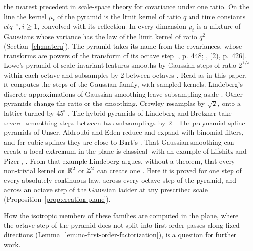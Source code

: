 the nearest precedent in scale-space theory for covariance under one ratio. On the line the kernel
$\mu_t$ of the \Matern{} pyramid is the limit kernel of ratio $q$ and time constants $ctq^{-i}$,
$i \ge 1$, convolved with its reflection. In every dimension $\mu_t$ is a mixture of Gaussians whose
variance has the law of the limit kernel of ratio $q^2$ (Section~\ref{ch:matern}). The \Matern{} pyramid takes its name from the \Matern{}
covariances, whose transforms are powers of the transform of its octave step [, p.~448; , (2), p.~426].
Lowe's pyramid of scale-invariant features smooths by Gaussian steps of ratio $2^{1/s}$ within each
octave and subsamples by $2$ between octaves \cite[pp.~6--7]{lowe2004distinctive}. Read as in this
paper, it computes the steps of the Gaussian family, with sampled kernels. Lindeberg's discrete
approximations of Gaussian smoothing leave subsampling aside \cite[p.~762]{lindeberg2024discrete}.
Other pyramids change the ratio or the smoothing. Crowley resamples by $\sqrt2$, onto a lattice
turned by $45^\circ$ \cite[\S 3.3.2, p.~32]{crowley1981representation}. The hybrid pyramids of
Lindeberg and Bretzner take several smoothing steps between two subsamplings by~$2$
\cite[\S 3.1]{lindeberg2003real}. The polynomial spline pyramids of Unser, Aldroubi and Eden reduce
and expand with binomial filters, and for cubic splines they are close to Burt's
\cite[\S IV.B, p.~370]{unser1993polynomial}.
That Gaussian smoothing can create a local extremum in the plane is classical, with an example of
Lifshitz and Pizer \cite[\S 4.1, p.~101]{lindeberg1994scale}, \cite[p.~369]{damonLocalMorseTheory1995}.
From that example Lindeberg argues, without a theorem, that every non-trivial kernel on $\mathbb{R}^2$ or
$\mathbb{Z}^2$ can create one \cite[\S 4.1, p.~101]{lindeberg1994scale}. Here it is proved for one step of every
absolutely continuous law, across every octave step of the \Matern{} pyramid, and across an octave
step of the Gaussian ladder at any prescribed scale (Proposition~\ref{prop:creation-plane}).

How the isotropic members of these families are computed in the plane, where the octave step of the
\Matern{} pyramid does not split into first-order passes along fixed directions
(Lemma~\ref{lem:no-first-order-factorization}), is a question for further work.

